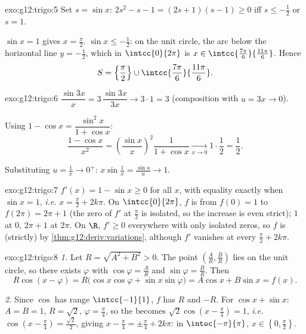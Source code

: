 \begin{solution}{exo:g12:trigo:5}
Set $s = \sin x$: $2s^2 - s - 1 = (2s + 1)(s - 1) \geq 0$ iff
$s \leq -\frac12$ or $s = 1$.

$\sin x = 1$ gives $x = \frac\pi2$. $\sin x \leq -\frac12$: on the unit
circle, the arc below the horizontal line $y = -\frac12$, which in
$\intcc{0}{2\pi}$ is $x \in \intcc{\frac{7\pi}{6}}{\frac{11\pi}{6}}$.
Hence
\[
S = \left\{\frac{\pi}{2}\right\} \cup
\intcc{\frac{7\pi}{6}}{\frac{11\pi}{6}} .
\]
\end{solution}

\begin{solution}{exo:g12:trigo:6}
$\dfrac{\sin 3x}{x} = 3\,\dfrac{\sin 3x}{3x} \to 3 \cdot 1 = 3$
(composition with $u = 3x \to 0$).

Using $1 - \cos x = \dfrac{\sin^2 x}{1 + \cos x}$:
\[
\frac{1 - \cos x}{x^2}
= \left(\frac{\sin x}{x}\right)^{\!2} \frac{1}{1 + \cos x}
\xrightarrow[x\to0]{} 1 \cdot \frac12 = \frac12 .
\]

Substituting $u = \frac1x \to 0^+$:
$x \sin\frac1x = \frac{\sin u}{u} \to 1$.
\end{solution}

\begin{solution}{exo:g12:trigo:7}
$f'(x) = 1 - \sin x \geq 0$ for all $x$, with equality exactly when
$\sin x = 1$, \emph{i.e.} $x = \frac\pi2 + 2k\pi$. On $\intcc{0}{2\pi}$, $f$
is  from $f(0) = 1$ to $f(2\pi) = 2\pi + 1$ (the zero of $f'$ at
$\frac{\pi}{2}$ is isolated, so the increase is even strict);  $1$ at
$0$,  $2\pi + 1$ at $2\pi$. On $\R$, $f' \geq 0$ everywhere with only
isolated zeros, so $f$ is (strictly)  by
\cref{thm:g12:deriv:variations}, although $f'$ vanishes at every
$\frac\pi2 + 2k\pi$.
\end{solution}

\begin{solution}{exo:g12:trigo:8}
\emph{1.} Let $R = \sqrt{A^2 + B^2} > 0$. The point
$\left(\frac AR, \frac BR\right)$ lies on the unit circle, so there exists
$\varphi$ with $\cos\varphi = \frac AR$ and $\sin\varphi = \frac BR$. Then
\[
R\cos(x - \varphi) = R\bigl(\cos x\cos\varphi + \sin x \sin\varphi\bigr)
= A\cos x + B\sin x = f(x).
\]

\emph{2.} Since $\cos$ has range $\intcc{-1}{1}$, $f$ has  $R$ and
 $-R$. For $\cos x + \sin x$: $A = B = 1$, $R = \sqrt2$,
$\varphi = \frac\pi4$, so the  becomes
$\sqrt2\cos\left(x - \frac\pi4\right) = 1$, \emph{i.e.}
$\cos\left(x - \frac\pi4\right) = \frac{\sqrt2}{2}$, giving
$x - \frac\pi4 = \pm\frac\pi4 + 2k\pi$: in $\intoc{-\pi}{\pi}$,
$x \in \left\{0, \frac\pi2\right\}$.
\end{solution}

